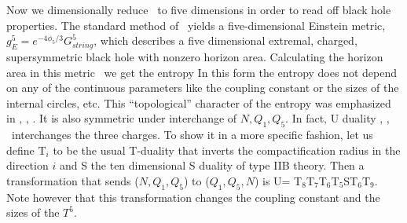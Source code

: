 Now we dimensionally reduce \tenfived\ to five dimensions in order to
read off black hole properties.
The standard method of  \dimensionalreduction ~yields
a five-dimensional Einstein metric,
$ g^5_E = e^{ - 4 \phi_5/3 } G^5_{string} $,
\eqn{}
which describes a five dimensional extremal, charged,
supersymmetric black hole with nonzero horizon area. Calculating the
horizon area in this metric \einstein ~we get the entropy
\eqn{}
In this form the entropy does not depend on any of the continuous
parameters like the coupling constant or the sizes of the internal
circles, etc. This ``topological'' character of
the entropy was emphasized in  %
\topological , \larsen  , \tseytlin .
 It is also symmetric under interchange of
$N, Q_1, Q_5$. In fact, U duality  %
\hull , \sentduality ,
\vafaintersecting\ 
interchanges the three  charges.
 To show it in a more specific fashion,
 let us define T$_i$ to be the usual T-duality that inverts the
 compactification radius in the direction $i$
 and S the ten dimensional S duality of
 type IIB theory. Then a transformation that
sends ($N,Q_1, Q_5$) to ($Q_1, Q_5, N$)
 is U= T$_8$T$_7$T$_6$T$_5$ST$_6$T$_9$. 
Note however that this transformation changes the 
coupling constant and the sizes of the $T^5$.


